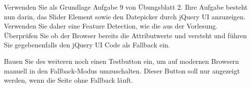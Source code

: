 %
\par Verwenden Sie als Grundlage Aufgabe 9 von Übungsblatt 2. Ihre Aufgabe besteht nun darin, das Slider Element sowie den Datepicker durch jQuery UI anzuzeigen. Verwenden Sie daher eine Feature Detection, wie die aus der Vorlesung. Überprüfen Sie ob der Browser bereits die Attributwerte  und  versteht und führen Sie gegebenenfalls den jQuery UI Code als Fallback ein.
%
\par Bauen Sie des weiteren noch einen Testbutton ein, um auf modernen Browsern manuell in den Fallback-Modus umzuschalten. Dieser Button soll nur angezeigt werden, wenn die Seite ohne Fallback läuft.